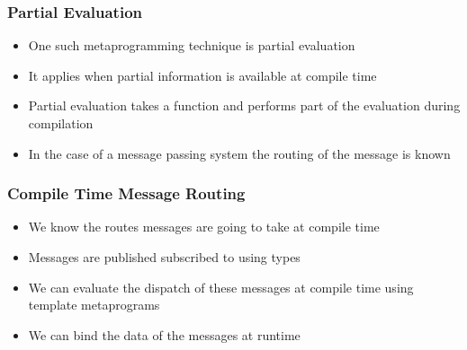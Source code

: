 \documentclass{beamer}
\begin{document}
	\begin{frame}
		\frametitle{Partial Evaluation}
		\begin{itemize}
			\item One such metaprogramming technique is partial evaluation
			\item It applies when partial information is available at compile time
			\item Partial evaluation takes a function and performs part of the evaluation during compilation
			\item In the case of a message passing system the routing of the message is known
		\end{itemize}
	\end{frame}
	
	\begin{frame}
		\frametitle{Compile Time Message Routing}
		\begin{itemize}
			\item We know the routes messages are going to take at compile time
			\item Messages are published subscribed to using types
			\item We can evaluate the dispatch of these messages at compile time using template metaprograms
			\item We can bind the data of the messages at runtime
		\end{itemize}
	\end{frame}
	
\end{document}
